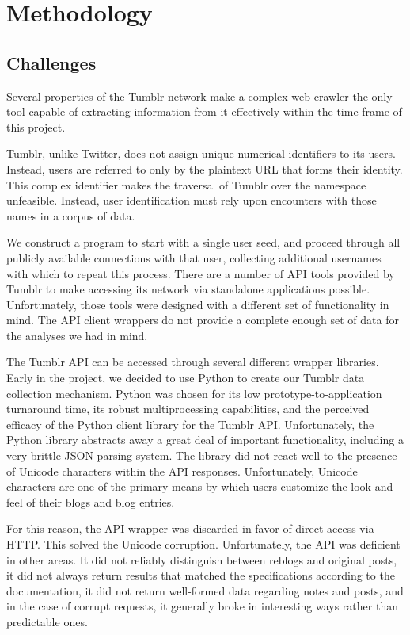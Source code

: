 \section{Methodology}
\label{sec:-method}

\subsection{Challenges}
Several properties of the Tumblr network make a complex web crawler the 
only tool capable of extracting information from it effectively within 
the time frame of this project.  

Tumblr, unlike Twitter, does not assign unique numerical identifiers 
to its users.  Instead, users are referred to only by the plaintext URL 
that forms their identity.  This complex identifier makes the traversal 
of Tumblr over the namespace unfeasible.  Instead, user identification 
must rely upon encounters with those names in a corpus of data.

We construct a program to start with a single user seed, and proceed 
through all publicly available connections with that user, collecting 
additional usernames with which to repeat this process.  There are a 
number of API tools provided by Tumblr to make accessing its network 
via standalone applications possible.  Unfortunately, those tools were 
designed with a different set of functionality in mind.  The API 
client wrappers do not provide a complete enough set of data for the 
analyses we had in mind.

The Tumblr API can be accessed through several different wrapper 
libraries.  Early in the project, we decided to use Python to create 
our Tumblr data collection mechanism.  Python was chosen for its 
low prototype-to-application turnaround time, its robust 
multiprocessing capabilities, and the perceived efficacy of the 
Python client library for the Tumblr API.  Unfortunately, the Python 
library abstracts away a great deal of important functionality, 
including a very brittle JSON-parsing system.  The library did not 
react well to the presence of Unicode characters within the API 
responses.  Unfortunately, Unicode characters are one of the primary 
means by which users customize the look and feel of their blogs and 
blog entries.

For this reason, the API wrapper was discarded in favor of direct 
access via HTTP.  This solved the Unicode corruption.  Unfortunately, 
the API was deficient in other areas.  It did not reliably distinguish 
between reblogs and original posts, it did not always return results 
that matched the specifications according to the documentation, it did 
not return well-formed data regarding notes and posts, and in the case 
of corrupt requests, it generally broke in interesting ways rather 
than predictable ones.

